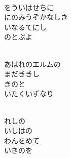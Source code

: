\documentclass[10pt,b5j]{tarticle} %
\begin{document}
\vspace{1.5em} %
\newcommand{\linespace}{0.5em} %
\newcommand{\blocksize}{0.5\hsize} %
\newcommand{\itemmargin}{3em} %
\begin{enumerate} %
    \setlength{\itemindent}{\itemmargin} %
    \begin{minipage}[c]{\blocksize}
    
        \vspace{\linespace}
        \item~\\
        をういはせちに\\
        にのみうぞかなしき\\
        いなるてにし\\
        のとぶよ
        
    \end{minipage}
    \begin{minipage}[c]{\blocksize}
        
        \vspace{\linespace}
        \item~\\
        あはれのエルムの\\
        まだききし\\
        きのと\\
        いたくいずなり
        
    \end{minipage}
    \begin{minipage}[c]{\blocksize}
        
        \vspace{\linespace}
        \item~\\
        れしの\\
        いしはの\\
        わんをめて\\
        いきのを
        

\end{minipage}
\end{enumerate}
\end{document}
